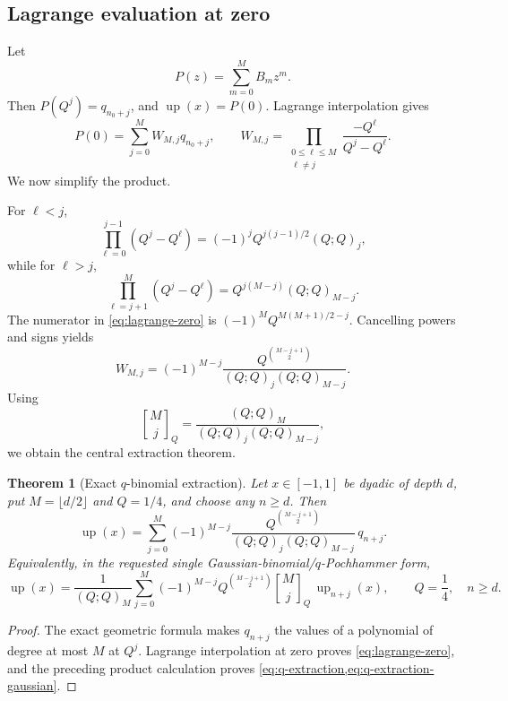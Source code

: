 \documentclass[11pt]{article}
\newtheorem{theorem}{Theorem}[section]
\newcommand{\upf}{\operatorname{up}}
\newcommand{\qbinom}[3]{\genfrac{[}{]}{0pt}{}{#1}{#2}_{#3}}
\begin{document}
\subsection{Lagrange evaluation at zero}

Let
\[
 P(z)=\sum_{m=0}^{M}B_mz^m.
\]
Then \(P(Q^j)=q_{n_0+j}\), and \(\upf(x)=P(0)\).  Lagrange interpolation gives
\begin{equation}\label{eq:lagrange-zero}
 P(0)=\sum_{j=0}^{M}W_{M,j}q_{n_0+j},
 \qquad
 W_{M,j}=\prod_{\substack{0\le\ell\le M\\\ell\ne j}}
 \frac{-Q^\ell}{Q^j-Q^\ell}.
\end{equation}
We now simplify the product.

For \(\ell<j\),
\[
 \prod_{\ell=0}^{j-1}(Q^j-Q^\ell)
 =(-1)^jQ^{j(j-1)/2}(Q;Q)_j,
\]
while for \(\ell>j\),
\[
 \prod_{\ell=j+1}^{M}(Q^j-Q^\ell)
 =Q^{j(M-j)}(Q;Q)_{M-j}.
\]
The numerator in \cref{eq:lagrange-zero} is
\((-1)^M Q^{M(M+1)/2-j}\).  Cancelling powers and signs yields
\begin{equation}\label{eq:weight-product}
 W_{M,j}=(-1)^{M-j}
 \frac{Q^{\binom{M-j+1}{2}}}{(Q;Q)_j(Q;Q)_{M-j}}.
\end{equation}
Using
\begin{equation}\label{eq:qbinom-def}
 \qbinom{M}{j}{Q}
 =\frac{(Q;Q)_M}{(Q;Q)_j(Q;Q)_{M-j}},
\end{equation}
we obtain the central extraction theorem.

\begin{theorem}[Exact \(q\)-binomial extraction]\label{thm:q-extraction}
Let \(x\in[-1,1]\) be dyadic of depth \(d\), put
\(M=\lfloor d/2\rfloor\) and \(Q=1/4\), and choose any \(n\ge d\).  Then
\begin{equation}\label{eq:q-extraction}
 \boxed{\displaystyle
 \upf(x)=
 \sum_{j=0}^{M}(-1)^{M-j}
 \frac{Q^{\binom{M-j+1}{2}}}{(Q;Q)_j(Q;Q)_{M-j}}\,q_{n+j}.}
\end{equation}
Equivalently, in the requested single Gaussian-binomial/\(q\)-Pochhammer form,
\begin{equation}\label{eq:q-extraction-gaussian}
 \boxed{\displaystyle
 \upf(x)=\frac{1}{(Q;Q)_M}
 \sum_{j=0}^{M}(-1)^{M-j}Q^{\binom{M-j+1}{2}}
 \qbinom{M}{j}{Q}\,\upf_{n+j}(x),
 \qquad Q=\frac14,\quad n\ge d.}
\end{equation}
\end{theorem}

\begin{proof}
The exact geometric formula makes \(q_{n+j}\) the values of a polynomial of
degree at most \(M\) at \(Q^j\).  Lagrange interpolation at zero proves
\cref{eq:lagrange-zero}, and the preceding product calculation proves
\cref{eq:q-extraction,eq:q-extraction-gaussian}.
\end{proof}
\end{document}
